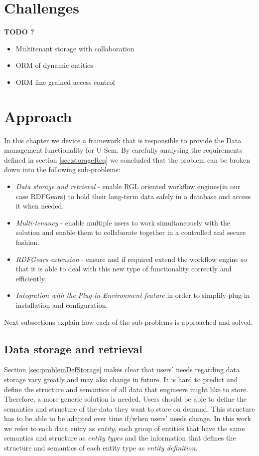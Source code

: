 \section{Challenges}
\textbf{TODO ?}
\begin{itemize}
	\item Multitenant storage with collaboration
	\item ORM of dynamic entities
	\item ORM fine grained access control
\end{itemize}

\section{Approach}
\label{sec:approachStorage}

In this chapter we device a framework that is responsible to provide the Data management functionality for U-Sem. By carefully analysing the requirements defined in section \ref{sec:storageReq} we concluded that the problem can be broken down into the following sub-problems:
\begin{itemize}
	\item \textit{Data storage and retrieval} - enable RGL oriented workflow engines(in our case RDFGears) to hold their long-term data safely in a database and access it when needed.
	\item \textit{Multi-tenancy} - enable multiple users to work simultaneously with the solution and enable them to collaborate together in a controlled and secure fashion.
	\item \textit{RDFGears extension} - ensure and if required extend the workflow engine so that it is able to deal with this new type of functionality correctly and efficiently.
	\item \textit{Integration with the Plug-in Environment feature} in order to simplify plug-in installation and configuration.
\end{itemize}

Next subsections explain how each of the sub-problems is approached and solved.

\subsection{Data storage and retrieval}

Section \ref{sec:problemDefStorage} makes clear that users' needs regarding data storage vary greatly and may also change in future. It is hard to predict and define the structure and semantics of all data that engineers might like to store. Therefore, a more generic solution is needed. Users should be able to define the semantics and structure of the data they want to store on demand. This structure has to be able to be adapted over time if/when users' needs change. In this work we refer to each data entry as \textit{entity}, each group of entities that have the same semantics and structure as \textit{entity types} and the information that defines the structure and semantics of each entity type as \textit{entity definition}.

